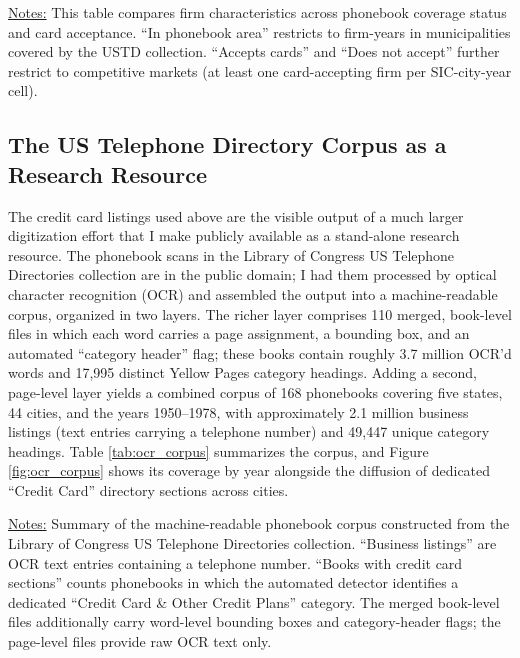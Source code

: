 \documentclass[12pt,english]{article}
\begin{document}
\begin{table}[H]
\caption{Firm Characteristics by Phonebook Coverage and Card Acceptance}\label{tab:yp_representativeness}
\centering

\newline
\noindent \small \uline{Notes:} This table compares firm characteristics across phonebook coverage status and card acceptance. ``In phonebook area'' restricts to firm-years in municipalities covered by the USTD collection. ``Accepts cards'' and ``Does not accept'' further restrict to competitive markets (at least one card-accepting firm per SIC-city-year cell).
\end{table}

\subsection*{The US Telephone Directory Corpus as a Research Resource}

The credit card listings used above are the visible output of a much larger digitization effort that I make publicly available as a stand-alone research resource. The phonebook scans in the Library of Congress US Telephone Directories collection are in the public domain; I had them processed by optical character recognition (OCR) and assembled the output into a machine-readable corpus, organized in two layers. The richer layer comprises 110 merged, book-level files in which each word carries a page assignment, a bounding box, and an automated ``category header'' flag; these books contain roughly 3.7 million OCR'd words and 17,995 distinct Yellow Pages category headings. Adding a second, page-level layer yields a combined corpus of 168 phonebooks covering five states, 44 cities, and the years 1950--1978, with approximately 2.1 million business listings (text entries carrying a telephone number) and 49{,}447 unique category headings. Table \ref{tab:ocr_corpus} summarizes the corpus, and Figure \ref{fig:ocr_corpus} shows its coverage by year alongside the diffusion of dedicated ``Credit Card'' directory sections across cities.

\begin{table}[H]
\caption{The US Telephone Directory OCR Corpus}\label{tab:ocr_corpus}
\centering

\newline
\noindent \small \uline{Notes:} Summary of the machine-readable phonebook corpus constructed from the Library of Congress US Telephone Directories collection. ``Business listings'' are OCR text entries containing a telephone number. ``Books with credit card sections'' counts phonebooks in which the automated detector identifies a dedicated ``Credit Card \& Other Credit Plans'' category. The merged book-level files additionally carry word-level bounding boxes and category-header flags; the page-level files provide raw OCR text only.
\end{table}
\end{document}
